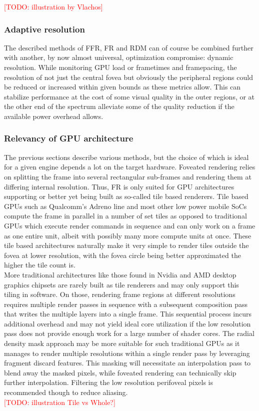 \textcolor{red}{[TODO: illustration by Vlachos]}

\subsubsection{Adaptive resolution}
The described methods of FFR, FR and RDM can of course be combined further with another, by now almost universal, optimization compromise: dynamic resolution. While monitoring GPU load or frametimes and framepacing, the resolution of not just the central fovea but obviously the peripheral regions could be reduced or increased within given bounds as these metrics allow. This can stabilize performance at the cost of some visual quality in the outer regions, or at the other end of the spectrum alleviate some of the quality reduction if the available power overhead allows. 

\subsubsection{Relevancy of GPU architecture}
The previous sections describe various methods, but the choice of which is ideal for a given engine depends a lot on the target hardware. Foveated rendering relies on splitting the frame into several rectangular sub-frames and rendering them at differing internal resolution. Thus, FR is only suited for GPU architectures supporting or better yet being built as so-called tile based renderers. Tile based GPUs such as Qualcomm's Adreno line and most other low power mobile SoCs compute the frame in parallel in a number of set tiles as opposed to traditional GPUs which execute render commands in sequence and can only work on a frame as one entire unit, albeit with possibly many more compute units at once. These tile based architectures naturally make it very simple to render tiles outside the fovea at lower resolution, with the fovea circle being better approximated the higher the tile count is. \\
More traditional architectures like those found in Nvidia and AMD desktop graphics chipsets are rarely built as tile renderers and may only support this tiling in software. On those, rendering frame regions at different resolutions requires multiple render passes in sequence with a subsequent composition pass that writes the multiple layers into a single frame. This sequential process incurs additional overhead and may not yield ideal core utilization if the low resolution pass does not provide enough work for a large number of shader cores. The radial density mask approach may be more suitable for such traditional GPUs as it manages to render multiple resolutions within a single render pass by leveraging fragment discard features. This masking will necessitate an interpolation pass to blend away the masked pixels, while foveated rendering can technically skip further interpolation. Filtering the low resolution perifoveal pixels is recommended though to reduce aliasing. \\

\textcolor{red}{[TODO: illustration Tile vs Whole?]}